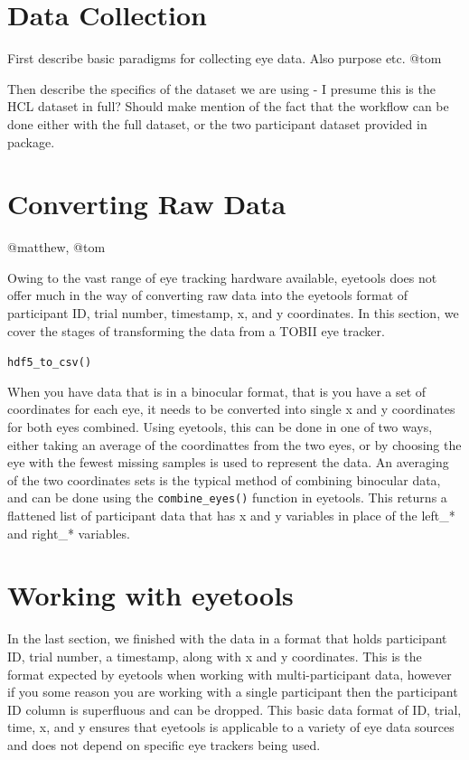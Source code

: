 \documentclass[
  man,
  floatsintext,
  longtable,
  nolmodern,
  notxfonts,
  notimes,
  colorlinks=true,linkcolor=blue,citecolor=blue,urlcolor=blue]{apa7}
\begin{document}
\section{Data Collection}\label{data-collection}

First describe basic paradigms for collecting eye data. Also purpose
etc. @tom

Then describe the specifics of the dataset we are using - I presume this
is the HCL dataset in full? Should make mention of the fact that the
workflow can be done either with the full dataset, or the two
participant dataset provided in package.

\section{Converting Raw Data}\label{converting-raw-data}

@matthew, @tom

Owing to the vast range of eye tracking hardware available, eyetools
does not offer much in the way of converting raw data into the eyetools
format of participant ID, trial number, timestamp, x, and y coordinates.
In this section, we cover the stages of transforming the data from a
TOBII eye tracker.

\texttt{hdf5\_to\_csv()}

When you have data that is in a binocular format, that is you have a set
of coordinates for each eye, it needs to be converted into single x and
y coordinates for both eyes combined. Using eyetools, this can be done
in one of two ways, either taking an average of the coordinattes from
the two eyes, or by choosing the eye with the fewest missing samples is
used to represent the data. An averaging of the two coordinates sets is
the typical method of combining binocular data, and can be done using
the \texttt{combine\_eyes()} function in eyetools. This returns a
flattened list of participant data that has x and y variables in place
of the left\_* and right\_* variables.

\section{Working with eyetools}\label{working-with-eyetools}

In the last section, we finished with the data in a format that holds
participant ID, trial number, a timestamp, along with x and y
coordinates. This is the format expected by eyetools when working with
multi-participant data, however if you some reason you are working with
a single participant then the participant ID column is superfluous and
can be dropped. This basic data format of ID, trial, time, x, and y
ensures that eyetools is applicable to a variety of eye data sources and
does not depend on specific eye trackers being used.
\end{document}
